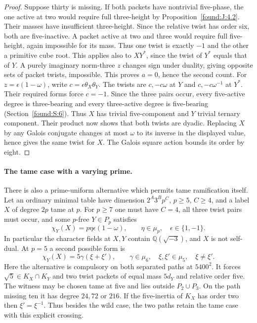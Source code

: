 \documentclass[11pt,a4paper]{article}
\numberwithin{equation}{section}
\theoremstyle{remark}
\newcommand{\QQ}{\mathbb Q}
\begin{document}
\begin{proof}
Suppose thirty is missing. If both packets have nontrivial five-phase, the one active at two would require full three-height by Proposition~\ref{found:J:4.2}. Their masses have insufficient three-height. Since the relative twist has order six, both are five-inactive. A packet active at two and three would require full five-height, again impossible for its mass. Thus one twist is exactly $-1$ and the other a primitive cube root. This applies also to $XY^*$, since the twist of $Y^*$ equals that of $Y$. A purely imaginary norm-three $z$ changes sign under duality, giving opposite sets of packet twists, impossible. This proves $a=0$, hence the second count. For $z=\epsilon(1-\omega)$, write $c=\epsilon\theta_X\theta_Y$. The twists are $c,-c\omega$ at $Y$ and $c,-c\omega^{-1}$ at $Y^*$. Their required forms force $c=-1$. Since the three pairs occur, every five-active degree is three-bearing and every three-active degree is five-bearing (Section~\ref{found:S:6}). Thus $X$ has trivial five-component and $Y$ trivial ternary component. Their product now shows that both twists are dyadic. Replacing $X$ by any Galois conjugate changes at most $\omega$ to its inverse in the displayed value, hence gives the same twist for $X$. The Galois square action bounds its order by eight.
\end{proof}

\paragraph{The tame case with a varying prime.}
There is also a prime-uniform alternative which permits tame ramification itself. Let an ordinary minimal table have dimension $2^A3^B p^C$, $p\ge5$, $C\ge4$, and a label $X$ of degree $2p$ tame at $p$. For $p\ge7$ one must have $C=4$, all three twist pairs must occur, and some $p$-free $Y\in P_p$ satisfies
\[
             \chi_Y(X)=p\eta\epsilon(1-\omega),
        \qquad \eta\in\mu_p,\quad \epsilon\in\{1,-1\}.
\]
In particular the character fields at $X,Y$ contain $\QQ(\sqrt{-3})$, and $X$ is not self-dual. At $p=5$ a second possible form is
\[
             \chi_Y(X)=5\gamma(\xi+\xi'),\qquad
 \gamma\in\mu_6,\quad \xi,\xi'\in\mu_5,\quad \xi\ne\xi'.
\]
Here the alternative is compulsory on both separated paths at $5400^2$. It forces $\sqrt5\in K_X\cap K_Y$ and two twist packets of equal mass $5d_Y$ and relative order five. The witness may be chosen tame at five and lies outside $P_2\cup P_3$. On the path missing ten it has degree $24,72$ or $216$. If the five-inertia of $K_X$ has order two then $\xi'=\xi^{-1}$. Thus besides the wild case, the two paths retain the tame case with this explicit crossing.
\end{document}
